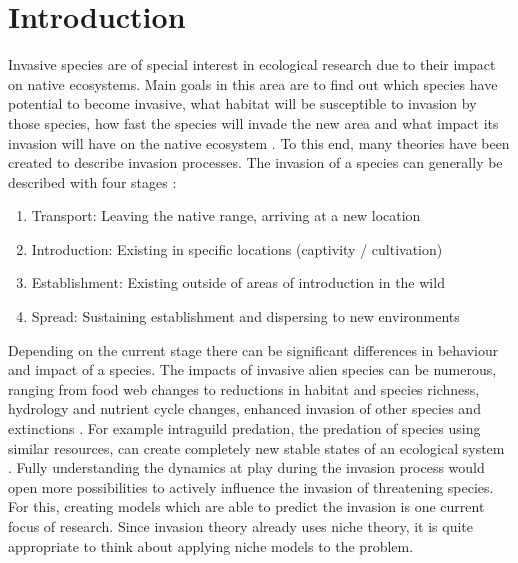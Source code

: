 \documentclass[12pt,a4paper]{article}
\begin{document}
\section{Introduction} \label{sec:introduction}
Invasive species are of special interest in ecological research due to their impact on native ecosystems.
Main goals in this area are to find out which species have potential to become invasive, what habitat will be susceptible to invasion by those species, how fast the species will invade the new area and what impact its invasion will have on the native ecosystem \autocite{shigesada1997invasions}.
To this end, many theories have been created to describe invasion processes.
The invasion of a species can  generally be described with four stages \autocite{blackburn2011invasionstages}:
\begin{enumerate} %
    \item Transport: Leaving the native range, arriving at a new location
    \item Introduction: Existing in specific locations (captivity / cultivation)
    \item Establishment: Existing outside of areas of introduction in the wild
    \item Spread: Sustaining establishment and dispersing to new environments
\end{enumerate}
Depending on the current stage there can be significant differences in behaviour and impact of a species.
The impacts of invasive alien species can be numerous, ranging from food web changes to reductions in habitat and species richness, hydrology and nutrient cycle changes, enhanced invasion of other species and extinctions \autocite{simberloff2013invasiveimpacts}.
For example intraguild predation, the predation of species using similar resources, can create completely new stable states of an ecological system \autocite{polis1989theoryIGP}.
Fully understanding the dynamics at play during the invasion process would open more possibilities to actively influence the invasion of threatening species.
For this, creating models which are able to predict the invasion is one current focus of research.
Since invasion theory already uses niche theory, it is quite appropriate to think about applying niche models to the problem.
\end{document}
